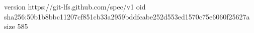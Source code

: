 version https://git-lfs.github.com/spec/v1
oid sha256:50b1b8bbc11207cf851cb33a2959bddfcabe252d553ed1570c75e6060f25627a
size 585
